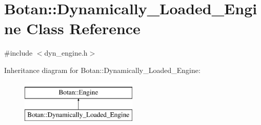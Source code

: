 \hypertarget{classBotan_1_1Dynamically__Loaded__Engine}{\section{Botan\-:\-:Dynamically\-\_\-\-Loaded\-\_\-\-Engine Class Reference}
\label{classBotan_1_1Dynamically__Loaded__Engine}
}


{\ttfamily \#include $<$dyn\-\_\-engine.\-h$>$}

Inheritance diagram for Botan\-:\-:Dynamically\-\_\-\-Loaded\-\_\-\-Engine\-:\begin{figure}[H]
\begin{center}
\leavevmode
\includegraphics[height=2.000000cm]{classBotan_1_1Dynamically__Loaded__Engine}
\end{center}
\end{figure}

